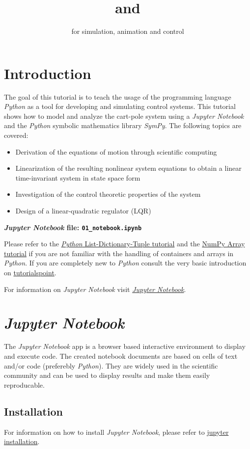 \documentclass[a4paper,11pt,headings=standardclasses,parskip=half]{scrartcl}
\title{\jp and \sympy}
\subtitle{\py for simulation, animation and control}%
\author{}
\date{}
\newcommand{\py}{\emph{Python}\xspace}
\newcommand{\jp}{\emph{Jupyter Notebook}\xspace}
\newcommand{\sympy}{\emph{SymPy}\xspace}
\begin{document}
\maketitle%

\tableofcontents

\newpage

\section{Introduction}
The goal of this tutorial is to teach the usage of the programming language \py as a tool for developing and simulating control systems. This tutorial shows how to model and analyze the cart-pole system using a \jp and the \py symbolic mathematics library \sympy.  The following topics are covered:
\begin{itemize}
\item Derivation of the equations of motion through scientific computing
\item Linearization of the resulting nonlinear system equations to obtain a linear time-invariant system in state space form
\item Investigation of the control theoretic properties of the system
\item Design of a linear-quadratic regulator (LQR)
\end{itemize}
\textbf{\emph{Jupyter Notebook} file: \texttt{01\_notebook.ipynb}}

Please refer to the \href{http://cs231n.github.io/python-numpy-tutorial/#python-containers}{\py List-Dictionary-Tuple tutorial} and the \href{http://cs231n.github.io/python-numpy-tutorial/#numpy}{NumPy Array tutorial} if you are not familiar with the handling of containers and arrays in \py. If you are completely new to \py consult the very basic introduction on \href{https://www.tutorialspoint.com/python/index.htm}{tutorialspoint}.

For information on \jp visit \href{https://jupyter.org}{\jp}. 
\section{\jp}
The \jp app is a browser based interactive environment to display and execute code. The created notebook documents are based on cells of text and/or code (preferebly \py). They are widely used in the scientific community and can be used to display results and make them easily reproducable.
\subsection{Installation}
For information on how to install \jp, please refer to \href{https://jupyter.readthedocs.io/en/latest/install.html}{jupyter installation}. 
\end{document}
